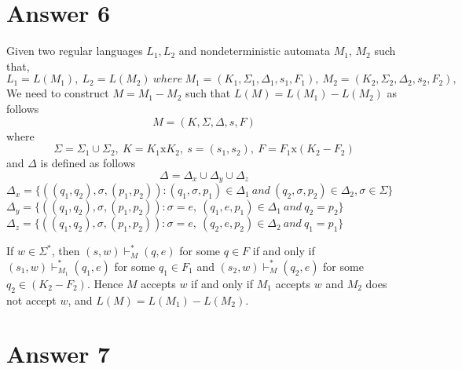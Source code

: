 \documentclass[12pt]{article}
\begin{document}
\section*{Answer 6}
Given two regular languages $L_1,L_2$ and nondeterministic automata $M_1$, $M_2$ such that, \\
$L_1=L(M_1),\ L_2=L(M_2)\ where\ M_1=(K_1,\Sigma _1, \Delta _1, s_1, F_1),\ M_2=(K_2,\Sigma _2, \Delta _2, s_2, F_2),\ $ \\
We need to construct $M=M_1 - M_2$ such that $L(M)=L(M_1) - L(M_2)$ as follows
$$M=(K,\Sigma,\Delta,s,F)$$ 
where 
$$\Sigma = \Sigma _1 \cup \Sigma_2,\ K=K_1\text{x} K_2,\ s=(s_1,s_2),\ F=F_1\text{x}(K_2-F_2)$$
and $\Delta$ is defined as follows \\
$$\Delta = \Delta _x \cup \Delta _y \cup \Delta _z$$
$\Delta _x=\{((q_1,q_2),\sigma ,(p_1,p_2)): (q_1,\sigma,p_1)\in \Delta _1\ and\ (q_2,\sigma,p_2)\in \Delta _2, \sigma \in \Sigma \}$ \\
$\Delta _y=\{((q_1,q_2),\sigma ,(p_1,p_2)): \sigma =e,\ (q_1,e,p_1)\in \Delta _1\ and\ q_2=p_2\}$ \\
$\Delta _z=\{((q_1,q_2),\sigma ,(p_1,p_2)): \sigma =e,\ (q_2,e,p_2)\in \Delta _2\ and\ q_1=p_1\}$ \\ \par
If $w\in \Sigma ^*$, then $(s,w)\vdash _M^*(q,e)$ for some $q\in F$ if and only if $(s_1,w)\vdash _{M_1}^*(q_1,e)$ for some $q_1\in F_1$ and $(s_2,w)\vdash _M^*(q_2,e)$ for some $q_2\in (K_2-F_2)$. Hence $M$ accepts $w$ if and only if $M_1$ accepts $w$ and $M_2$ does not accept $w$, and $L(M)=L(M_1)-L(M_2)$.

\section*{Answer 7}
\end{document}
